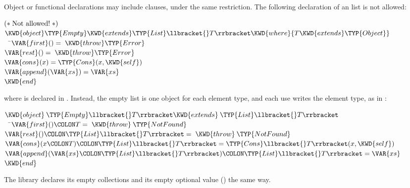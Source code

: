 Object or functional declarations may include  clauses,
under the same restriction.
The following declaration of an  list is not allowed:
\begin{Fortress}
\(\mathtt{(*}\;\hbox{\rm  Not allowed! \unskip}\;\mathtt{*)}\)\\
\(\KWD{object} \TYP{Empty} \KWD{extends} \TYP{List}\llbracket{}T\rrbracket \KWD{where} \{T \KWD{extends} \TYP{Object}\}\)\\
{\tt~~}\pushtabs\=\+\(  \VAR{first}() = \;\KWD{throw} \TYP{Error}\)\\
\(  \VAR{rest}() = \;\KWD{throw} \TYP{Error}\)\\
\(  \VAR{cons}(x) = \TYP{Cons}(x,\KWD{self})\)\\
\(  \VAR{append}(\VAR{xs}) = \VAR{xs}\)\-\\\poptabs
\(\KWD{end}\)
\end{Fortress}
where  is declared in .
Instead, the empty list is one object for each element type,
and each use writes the element type,
as in :
\begin{Fortress}
\(\KWD{object}\:\TYP{Empty}\llbracket{}T\rrbracket \KWD{extends}\:\TYP{List}\llbracket{}T\rrbracket\)\\
{\tt~~}\pushtabs\=\+\(  \VAR{first}()\COLON T = \;\KWD{throw}\:\TYP{NotFound}\)\\
\(  \VAR{rest}()\COLON \TYP{List}\llbracket{}T\rrbracket = \;\KWD{throw}\:\TYP{NotFound}\)\\
\(  \VAR{cons}(x\COLON T)\COLON \TYP{List}\llbracket{}T\rrbracket = \TYP{Cons}\llbracket{}T\rrbracket(x, \KWD{self})\)\\
\(  \VAR{append}(\VAR{xs}\COLON \TYP{List}\llbracket{}T\rrbracket)\COLON \TYP{List}\llbracket{}T\rrbracket = \VAR{xs}\)\-\\\poptabs
\(\KWD{end}\)
\end{Fortress}
The library declares its empty collections and its empty optional value
() the same way.
